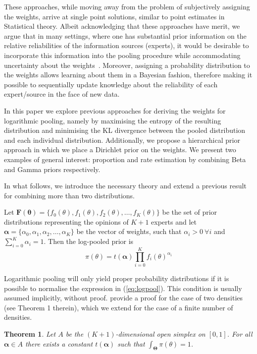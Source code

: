 \documentclass[a4paper, notitlepage, 10pt]{article}
\newtheorem{theo}{Theorem}[]
\begin{document}
These approaches, while moving away from the problem of 
subjectively 
assigning the weights, arrive at single point solutions, similar to point 
estimates in Statistical theory.
Albeit acknowledging that these approaches have merit, we argue that in many settings, where one has substantial prior information on the relative reliabilities of the information sources (experts), it would be desirable to incorporate this information into the pooling procedure while accommodating uncertainty about the weights~\citep{poole2000}.
Moreover, assigning a probability distribution to the weights allows learning about them in a Bayesian fashion, therefore making it possible to sequentially update knowledge about the reliability of each expert/source in the face of new data.

In this paper we explore previous approaches for deriving the weights for logarithmic pooling, namely by maximising the entropy of the resulting distribution and minimising the KL divergence between the pooled distribution and each individual distribution.
Additionally, we propose a hierarchical prior approach in which we place a Dirichlet prior on the weights.
We present two examples of general interest: proportion and rate estimation by combining Beta and Gamma priors respectively.

In what follows, we introduce the necessary theory and extend a previous 
result~\citep{poole2000} for combining more than two distributions.

Let $\mathbf{F(\theta)} = \{f_0(\theta), f_1(\theta), f_2(\theta), \ldots, f_K(\theta)\}$ be the set of prior distributions representing the opinions of $K+1$ experts and let $\boldsymbol\alpha =\{\alpha_0, \alpha_1, \alpha_2, \ldots, \alpha_K \}$ be the vector of weights, such that $\alpha_i > 0\: \forall i$ and $\sum_{i=0}^K \alpha_i = 1$.
Then the log-pooled prior is
\begin{equation}
\label{eq:logpool}
 \pi(\theta) = t(\boldsymbol\alpha) \prod_{i=0}^K f_i(\theta)^{\alpha_i} 
\end{equation}

Logarithmic pooling will only yield proper probability distributions if it is possible to normalise the expression in (\ref{eq:logpool}).
This condition is usually assumed implicitly, without proof.
\citet{poole2000} provide a proof for the case of two densities (see Theorem 1 therein), which we extend for the case of a finite number of densities.
\begin{theo}
\label{thm:normalisation}
Let $A$ be the $(K+1)$-dimensional open simplex on $[0,1]$.
For all $\boldsymbol\alpha \in A$ there exists a constant $t(\boldsymbol\alpha)$ such that $\int_{\boldsymbol\Theta}\pi(\theta) = 1$.
\end{theo}
\end{document}
